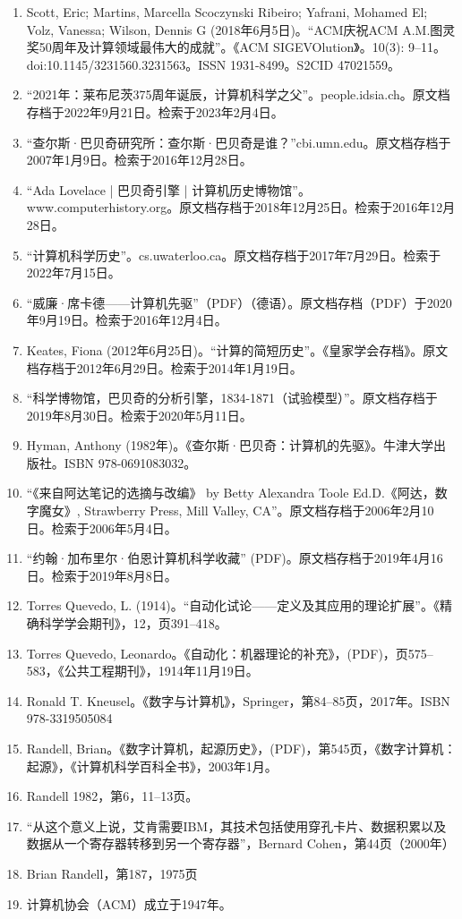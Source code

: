 \begin{enumerate}
\item Scott, Eric; Martins, Marcella Scoczynski Ribeiro; Yafrani, Mohamed El; Volz, Vanessa; Wilson, Dennis G (2018年6月5日)。“ACM庆祝ACM A.M.图灵奖50周年及计算领域最伟大的成就”。《ACM SIGEVOlution》。10(3): 9–11。doi:10.1145/3231560.3231563。ISSN 1931-8499。S2CID 47021559。  
\item “2021年：莱布尼茨375周年诞辰，计算机科学之父”。people.idsia.ch。原文档存档于2022年9月21日。检索于2023年2月4日。  
\item “查尔斯·巴贝奇研究所：查尔斯·巴贝奇是谁？”cbi.umn.edu。原文档存档于2007年1月9日。检索于2016年12月28日。  
\item “Ada Lovelace | 巴贝奇引擎 | 计算机历史博物馆”。www.computerhistory.org。原文档存档于2018年12月25日。检索于2016年12月28日。  
\item “计算机科学历史”。cs.uwaterloo.ca。原文档存档于2017年7月29日。检索于2022年7月15日。  
\item “威廉·席卡德——计算机先驱”（PDF）（德语）。原文档存档（PDF）于2020年9月19日。检索于2016年12月4日。  
\item Keates, Fiona (2012年6月25日)。“计算的简短历史”。《皇家学会存档》。原文档存档于2012年6月29日。检索于2014年1月19日。  
\item “科学博物馆，巴贝奇的分析引擎，1834-1871（试验模型）”。原文档存档于2019年8月30日。检索于2020年5月11日。  
\item Hyman, Anthony (1982年)。《查尔斯·巴贝奇：计算机的先驱》。牛津大学出版社。ISBN 978-0691083032。

\item “《来自阿达笔记的选摘与改编》 by Betty Alexandra Toole Ed.D.《阿达，数字魔女》, Strawberry Press, Mill Valley, CA”。原文档存档于2006年2月10日。检索于2006年5月4日。  
\item “约翰·加布里尔·伯恩计算机科学收藏” (PDF)。原文档存档于2019年4月16日。检索于2019年8月8日。  
\item Torres Quevedo, L. (1914)。“自动化试论——定义及其应用的理论扩展”。《精确科学学会期刊》，12，页391–418。  
\item Torres Quevedo, Leonardo。《自动化：机器理论的补充》，(PDF)，页575–583，《公共工程期刊》，1914年11月19日。  
\item Ronald T. Kneusel。《数字与计算机》，Springer，第84–85页，2017年。ISBN 978-3319505084  
\item Randell, Brian。《数字计算机，起源历史》，(PDF)，第545页，《数字计算机：起源》，《计算机科学百科全书》，2003年1月。  
\item Randell 1982，第6，11–13页。  
\item “从这个意义上说，艾肯需要IBM，其技术包括使用穿孔卡片、数据积累以及数据从一个寄存器转移到另一个寄存器”，Bernard Cohen，第44页（2000年）  
\item Brian Randell，第187，1975页  
\item 计算机协会（ACM）成立于1947年。
\end{enumerate}